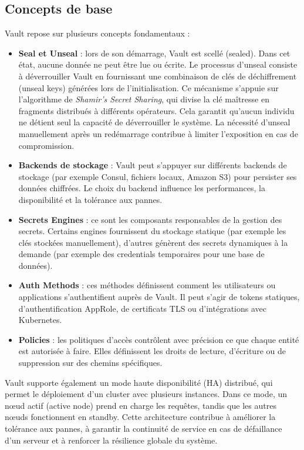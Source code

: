 \subsection{Concepts de base}

Vault repose sur plusieurs concepts fondamentaux :

\begin{itemize}
	\item \textbf{Seal et Unseal} : lors de son démarrage, Vault est scellé (sealed). Dans cet état, aucune donnée ne peut être lue ou écrite. Le processus d’unseal consiste à déverrouiller Vault en fournissant une combinaison de clés de déchiffrement (unseal keys) générées lors de l’initialisation. Ce mécanisme s’appuie sur l’algorithme de \emph{Shamir’s Secret Sharing}, qui divise la clé maîtresse en fragments distribués à différents opérateurs. Cela garantit qu’aucun individu ne détient seul la capacité de déverrouiller le système. La nécessité d’unseal manuellement après un redémarrage contribue à limiter l’exposition en cas de compromission.
	\item \textbf{Backends de stockage} : Vault peut s’appuyer sur différents backends de stockage (par exemple Consul, fichiers locaux, Amazon S3) pour persister ses données chiffrées. Le choix du backend influence les performances, la disponibilité et la tolérance aux pannes.
	\item \textbf{Secrets Engines} : ce sont les composants responsables de la gestion des secrets. Certains engines fournissent du stockage statique (par exemple les clés stockées manuellement), d’autres génèrent des secrets dynamiques à la demande (par exemple des credentials temporaires pour une base de données).
	\item \textbf{Auth Methods} : ces méthodes définissent comment les utilisateurs ou applications s’authentifient auprès de Vault. Il peut s’agir de tokens statiques, d’authentification AppRole, de certificats TLS ou d’intégrations avec Kubernetes.
	\item \textbf{Policies} : les politiques d’accès contrôlent avec précision ce que chaque entité est autorisée à faire. Elles définissent les droits de lecture, d’écriture ou de suppression sur des chemins spécifiques.
\end{itemize}

Vault supporte également un mode haute disponibilité (HA) distribué, qui permet le déploiement d’un cluster avec plusieurs instances. Dans ce mode, un nœud actif (active node) prend en charge les requêtes, tandis que les autres nœuds fonctionnent en standby. Cette architecture contribue à améliorer la tolérance aux pannes, à garantir la continuité de service en cas de défaillance d’un serveur et à renforcer la résilience globale du système.
